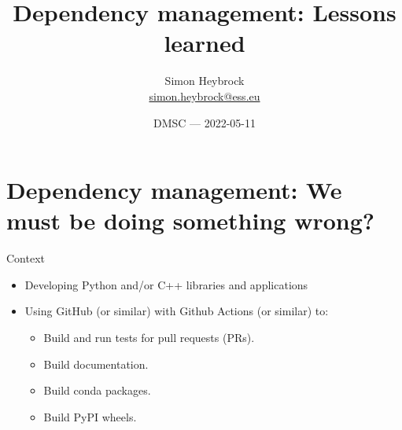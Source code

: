 \documentclass[english,aspectratio=1610,smaller]{beamer}
\begin{document}
\title{Dependency management: Lessons learned}
\author[Simon Heybrock]{Simon Heybrock \\{\footnotesize\url{simon.heybrock@ess.eu}}\\\vspace{2mm}
}

\date{\scriptsize DMSC --- 2022-05-11}


\begin{frame}[plain]
    \titlepage
\end{frame}


\section{Dependency management: We must be doing something wrong?}

\begin{frame}{Context}
  \begin{itemize}
    \item Developing Python and/or C++ libraries and applications
    \item Using GitHub (or similar) with Github Actions (or similar) to:
      \begin{itemize}
        \item Build and run tests for pull requests (PRs).
        \item Build documentation.
        \item Build conda packages.
        \item Build PyPI wheels.
      \end{itemize}
  \end{itemize}
\end{frame}
\end{document}
